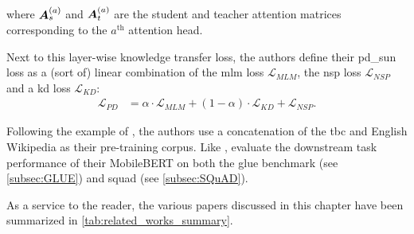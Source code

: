 where $\vect{A}_s^{(a)}$ and $\vect{A}_t^{(a)}$ are the student and teacher attention matrices corresponding to the $a^{\text{th}}$ attention head.

Next to this layer-wise knowledge transfer loss, the authors define their \gls{pd_sun} loss as a (sort of) linear combination of the \gls{mlm} loss $\mathcal{L}_{MLM}$, the \gls{nsp} loss $\mathcal{L}_{NSP}$ and a \gls{kd} loss $\mathcal{L}_{KD}$:
\begin{align}
    \mathcal{L}_{PD} &= \alpha \cdot \mathcal{L}_{MLM} + (1 - \alpha) \cdot \mathcal{L}_{KD} + \mathcal{L}_{NSP}.
\end{align}

Following the example of \citet{devlin2018bert}, the authors use a concatenation of the \gls{tbc} and English Wikipedia as their pre-training corpus. Like \citet{sanh2019distilbert}, \citet{sun2020mobilebert} evaluate the downstream task performance of their MobileBERT on both the \gls{glue} benchmark (see \cref{subsec:GLUE}) and \gls{squad} (see \cref{subsec:SQuAD}).

As a service to the reader, the various papers discussed in this chapter have been summarized in \cref{tab:related_works_summary}.

